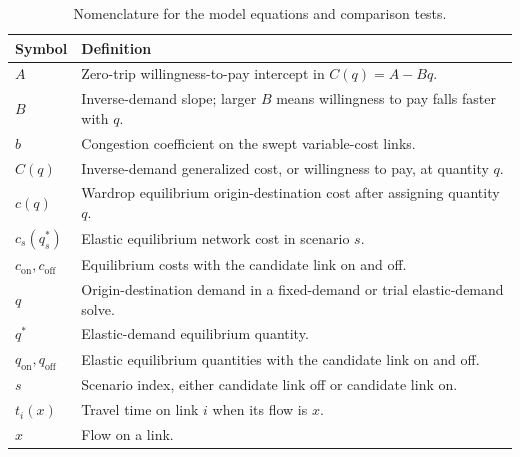 \documentclass{article}
\begin{document}
\begin{table}[H]
  \centering
  \small
  \begin{tabular}{ll}
    \toprule
    Symbol & Definition \\
    \midrule
    \(A\) & Zero-trip willingness-to-pay intercept in \(C(q)=A-Bq\). \\
    \(B\) & Inverse-demand slope; larger \(B\) means willingness to pay falls faster with \(q\). \\
    \(b\) & Congestion coefficient on the swept variable-cost links. \\
    \(C(q)\) & Inverse-demand generalized cost, or willingness to pay, at quantity \(q\). \\
    \(c(q)\) & Wardrop equilibrium origin-destination cost after assigning quantity \(q\). \\
    \(c_s(q_s^*)\) & Elastic equilibrium network cost in scenario \(s\). \\
    \(c_{\mathrm{on}}, c_{\mathrm{off}}\) & Equilibrium costs with the candidate link on and off. \\
    \(q\) & Origin-destination demand in a fixed-demand or trial elastic-demand solve. \\
    \(q^*\) & Elastic-demand equilibrium quantity. \\
    \(q_{\mathrm{on}}, q_{\mathrm{off}}\) & Elastic equilibrium quantities with the candidate link on and off. \\
    \(s\) & Scenario index, either candidate link off or candidate link on. \\
    \(t_i(x)\) & Travel time on link \(i\) when its flow is \(x\). \\
    \(x\) & Flow on a link. \\
    \bottomrule
  \end{tabular}
  \caption{Nomenclature for the model equations and comparison tests.}
  \label{tab:nomenclature}
\end{table}
\end{document}

